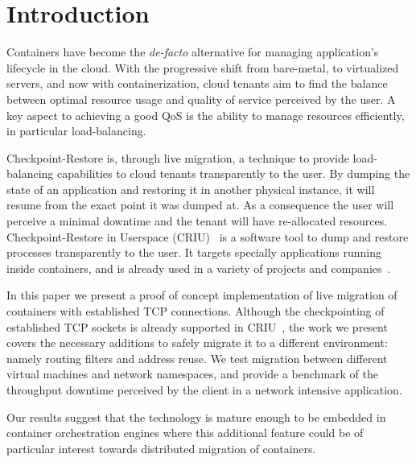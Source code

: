 \section{Introduction} \label{sec:introduction}

Containers have become the \textit{de-facto} alternative for managing application's lifecycle in the cloud.
With the progressive shift from bare-metal, to virtualized servers, and now with containerization, cloud tenants aim to find the balance between optimal resource usage and quality of service perceived by the user.
A key aspect to achieving a good QoS is the ability to manage resources efficiently, in particular load-balancing.

Checkpoint-Restore is, through live migration, a technique to provide load-balancing capabilities to cloud tenants transparently to the user.
By dumping the state of an application and restoring it in another physical instance, it will resume from the exact point it was dumped at.
As a consequence the user will perceive a minimal downtime and the tenant will have re-allocated resources.
Checkpoint-Restore in Userspace (CRIU)~\cite{criu-main-page} is a software tool to dump and restore processes transparently to the user.
It targets specially applications running inside containers, and is already used in a variety of projects and companies~\cite{Tucker18}.

In this paper we present a proof of concept implementation of live migration of containers with established TCP connections.
Although the checkpointing of established TCP sockets is already supported in CRIU~\cite{criu-tcp}, the work we present covers the necessary additions to safely migrate it to a different environment: namely routing filters and address reuse.
We test migration between different virtual machines and network namespaces, and provide a benchmark of the throughput downtime perceived by the client in a network intensive application.

Our results suggest that the technology is mature enough to be embedded in container orchestration engines where this additional feature could be of particular interest towards distributed migration of containers.
